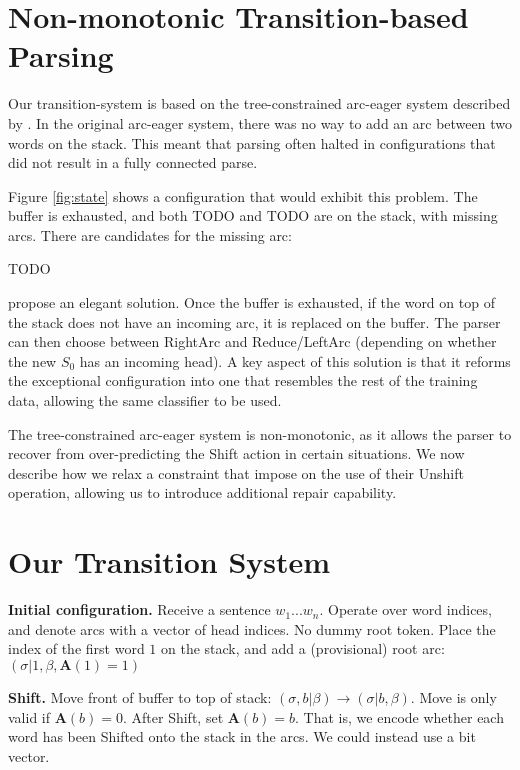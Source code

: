 \documentclass[11pt,letterpaper]{article}
\begin{document}
\section{Non-monotonic Transition-based Parsing}

Our transition-system is based on the tree-constrained arc-eager system described
by \citet{nivre:14}.  In the original arc-eager system, there was no way to add
an arc between two words on the stack.  This meant that parsing often halted in
configurations that did not result in a fully connected parse.

Figure \ref{fig:state} shows a configuration that would exhibit this problem.
The buffer is exhausted, and both TODO and TODO are on the stack, with missing
arcs. There are candidates for the missing arc:

TODO

\citet{nivre:14} propose an elegant solution.  Once the buffer is exhausted, if
the word on top of the stack does not have an incoming arc, it is replaced on the
buffer.  The parser can then choose between RightArc and Reduce/LeftArc (depending
on whether the new $S_0$ has an incoming head).
A key aspect of this solution is that it reforms the exceptional configuration
into one that resembles the rest of the training data, allowing the same classifier
to be used.

The tree-constrained arc-eager system is non-monotonic, as it allows the parser
to recover from over-predicting the Shift action in certain situations.  We now
describe how we relax a constraint that \citet{nivre:14} impose on the use of
their Unshift operation, allowing us to introduce additional repair capability.

\section{Our Transition System}

\textbf{Initial configuration.} Receive a sentence $w_1 ... w_n$. Operate over
word indices, and denote arcs with a vector of head indices.  No dummy root token. 
Place the index of the first word $1$ on the stack, and add a (provisional) root
arc: $(\sigma | 1, \beta, \mathbf{A}(1)=1)$

\textbf{Shift.} Move front of buffer to top of stack:
$(\sigma, b | \beta) \rightarrow (\sigma | b, \beta)$.  Move is only valid if
$\mathbf{A}(b)=0$. After Shift, set $\mathbf{A}(b)=b$.  That is, we encode whether
each word has been Shifted onto the stack in the arcs. We could instead use a
bit vector.
\end{document}
